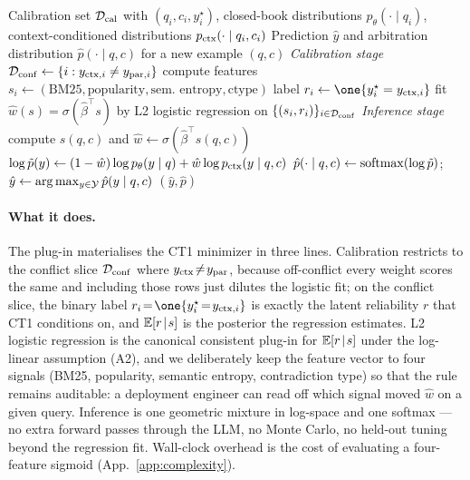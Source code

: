 \begin{algorithm}[H]
\small
\caption{\textsc{BayesArbiter} plug-in.  Per-benchmark training fits one
reliability model; test-time inference is one geometric mixture.}
\begin{algorithmic}
\Require Calibration set $\mathcal{D}_{\mathrm{cal}}$ with $(q_i,c_i,y_i^\star)$,
closed-book distributions $p_\theta(\cdot\mid q_i)$, context-conditioned
distributions $p_{\mathrm{ctx}}(\cdot\mid q_i,c_i)$
\Ensure Prediction $\hat y$ and arbitration distribution $\hat p(\cdot\mid q,c)$
for a new example $(q,c)$
\Statex \textit{Calibration stage}
\State $\mathcal{D}_{\mathrm{conf}}\gets \{i:y_{\mathrm{ctx},i}\neq y_{\mathrm{par},i}\}$
  \State compute features $s_i\gets(\text{BM25},\text{popularity},\text{sem.\ entropy},\text{ctype})$
  \State label $r_i\gets \one{y_i^\star=y_{\ctx,i}}$
\EndFor
\State fit $\hat w(s)=\sigma(\hat\beta^\top s)$ by L2 logistic regression on
$\{(s_i,r_i)\}_{i\in\mathcal{D}_{\mathrm{conf}}}$
\Statex \textit{Inference stage}
\State compute $s(q,c)$ and $\hat w\gets \sigma(\hat\beta^\top s(q,c))$
  \State $\log \tilde p(y)\gets (1-\hat w)\log p_\theta(y\mid q)+\hat w\log p_{\mathrm{ctx}}(y\mid q,c)$
\EndFor
\State $\hat p(\cdot\mid q,c)\gets \operatorname{softmax}(\log \tilde p)$;
$\hat y\gets \arg\max_{y\in\mathcal{Y}}\hat p(y\mid q,c)$
\State \Return $(\hat y,\hat p)$
\end{algorithmic}
\end{algorithm}

\paragraph{What it does.} The plug-in materialises the CT1 minimizer in three lines. Calibration restricts to the conflict slice $\mathcal{D}_{\mathrm{conf}}$ where $y_{\mathrm{ctx}}\!\neq\!y_{\mathrm{par}}$, because off-conflict every weight scores the same and including those rows just dilutes the logistic fit; on the conflict slice, the binary label $r_i\!=\!\one{y_i^\star\!=\!y_{\ctx,i}}$ is exactly the latent reliability $r$ that CT1 conditions on, and $\mathbb{E}[r\!\mid\!s]$ is the posterior the regression estimates. L2 logistic regression is the canonical consistent plug-in for $\mathbb{E}[r\!\mid\!s]$ under the log-linear assumption (A2), and we deliberately keep the feature vector to four signals (BM25, popularity, semantic entropy, contradiction type) so that the rule remains auditable: a deployment engineer can read off which signal moved $\hat w$ on a given query. Inference is one geometric mixture in log-space and one softmax — no extra forward passes through the LLM, no Monte Carlo, no held-out tuning beyond the regression fit. Wall-clock overhead is the cost of evaluating a four-feature sigmoid (App.~\ref{app:complexity}).

